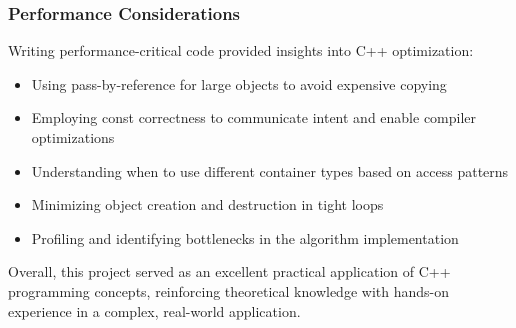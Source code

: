 \subsubsection{Performance Considerations}
Writing performance-critical code provided insights into C++ optimization:

\begin{itemize}
    \item Using pass-by-reference for large objects to avoid expensive copying
    \item Employing const correctness to communicate intent and enable compiler optimizations
    \item Understanding when to use different container types based on access patterns
    \item Minimizing object creation and destruction in tight loops
    \item Profiling and identifying bottlenecks in the algorithm implementation
\end{itemize}

Overall, this project served as an excellent practical application of C++ programming concepts, reinforcing theoretical knowledge with hands-on experience in a complex, real-world application.